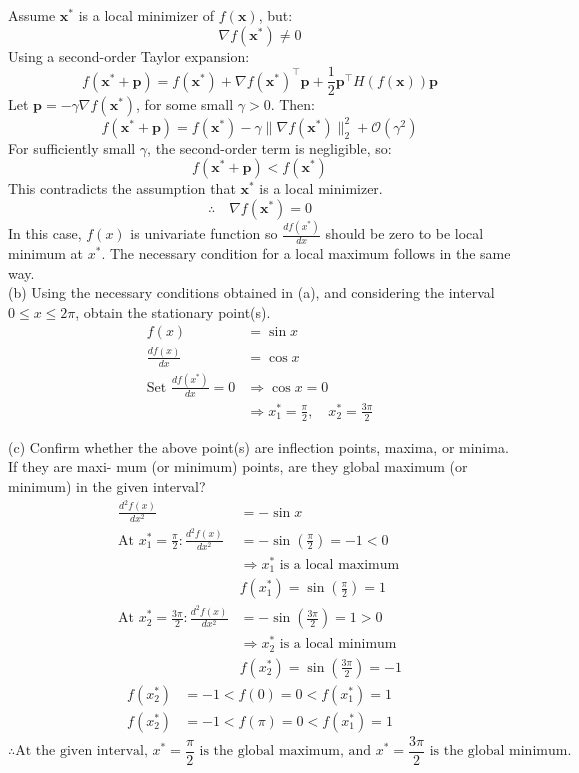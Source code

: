 \documentclass{article} %
\begin{document}
{    Assume \( \mathbf{x}^* \) is a local minimizer of \( f(\mathbf{x}) \), but:
    \[
    \nabla f(\mathbf{x}^*) \neq 0
    \]
    Using a second-order Taylor expansion:
    \[
    f(\mathbf{x}^* + \mathbf{p}) = f(\mathbf{x}^*) + \nabla f(\mathbf{x}^*)^\top \mathbf{p} + \frac{1}{2} \mathbf{p}^\top H(f(\mathbf{x})) \mathbf{p}
    \]
    Let \( \mathbf{p} = -\gamma \nabla f(\mathbf{x}^*) \), for some small \( \gamma > 0 \). Then:
    \[
    f(\mathbf{x}^* + \mathbf{p}) = f(\mathbf{x}^*) - \gamma \| \nabla f(\mathbf{x}^*) \|_2^2 + \mathcal{O}(\gamma^2)
    \]
    For sufficiently small \( \gamma \), the second-order term is negligible, so:
    \[
    f(\mathbf{x}^* + \mathbf{p}) < f(\mathbf{x}^*)
    \]
    This contradicts the assumption that \( \mathbf{x}^* \) is a local minimizer.
    \[
    \therefore \quad \nabla f(\mathbf{x}^*) = 0
    \]
    In this case, $ f(x) $ is univariate function so $ \frac{df(x^*)}{dx} $ should be zero to be local minimum at $ x^* $.
    The necessary condition for a local maximum follows in the same way. \\

    \noindent (b) Using the necessary conditions obtained in (a), and considering the interval $ 0 \leq x \leq 2\pi $, obtain
    the stationary point(s). 
    \begin{align*}
    f(x) &= \sin x \\
    \frac{df(x)}{dx} &= \cos x \\
    \text{Set } \frac{df(x^*)}{dx} = 0 &\Rightarrow \cos x = 0 \\
    &\Rightarrow x_1^* = \frac{\pi}{2}, \quad x_2^* = \frac{3\pi}{2}
    \end{align*}

    \noindent (c) Confirm whether the above point(s) are inflection points, maxima, or minima. If they are maxi-
    mum (or minimum) points, are they global maximum (or minimum) in the given interval?
    \begin{align*}
    \frac{d^2 f(x)}{dx^2} &= -\sin x \\
    \text{At } x_1^* = \frac{\pi}{2}: \frac{d^2 f(x)}{dx^2} &= -\sin\left(\frac{\pi}{2}\right) = -1 < 0 \\
    &\Rightarrow x_1^* \text{ is a local maximum} \\
    &f(x_1^*) = \sin\left(\frac{\pi}{2}\right) = 1 \\
    \text{At } x_2^* = \frac{3\pi}{2}: \frac{d^2 f(x)}{dx^2} &= -\sin\left(\frac{3\pi}{2}\right) = 1 > 0 \\
    &\Rightarrow x_2^* \text{ is a local minimum} \\
    &f(x_2^*) = \sin\left(\frac{3\pi}{2}\right) = -1
    \end{align*}
    \begin{align*}
    f(x_2^*) &= -1 < f(0) = 0 < f(x_1^*) = 1 \\
    f(x_2^*) &= -1 < f(\pi) = 0 < f(x_1^*) = 1
    \end{align*}
    \[\therefore \text{At the given interval, } x^* = \frac{\pi}{2} \text{ is the global maximum, and } x^* = \frac{3\pi}{2} \text{ is the global minimum}.\]

}
\end{document}
